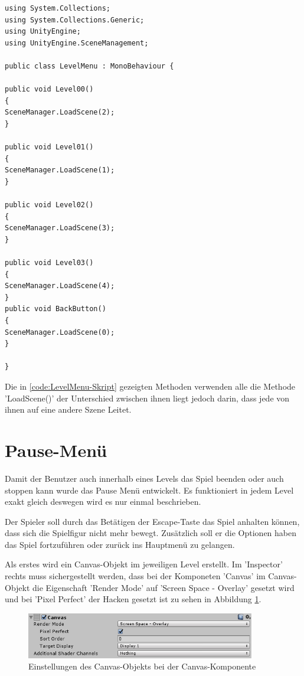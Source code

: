\begin{lstlisting}[language={[Sharp]C}, caption=LevelMenu-Script, label=code:LevelMenu-Skript]
using System.Collections;
using System.Collections.Generic;
using UnityEngine;
using UnityEngine.SceneManagement;

public class LevelMenu : MonoBehaviour {

public void Level00()
{
SceneManager.LoadScene(2);
}

public void Level01()
{
SceneManager.LoadScene(1);
}

public void Level02()
{
SceneManager.LoadScene(3);
}

public void Level03()
{
SceneManager.LoadScene(4);
}
public void BackButton()
{
SceneManager.LoadScene(0);
}

}
\end{lstlisting}

Die in \cref{code:LevelMenu-Skript} gezeigten Methoden verwenden alle die Methode 'LoadScene()' der Unterschied zwischen ihnen liegt jedoch darin, dass jede von ihnen auf eine andere Szene Leitet.
\section{Pause-Menü}
Damit der Benutzer auch innerhalb eines Levels das Spiel beenden oder auch stoppen kann wurde das Pause Menü entwickelt. Es funktioniert in jedem Level exakt gleich deswegen wird es nur einmal beschrieben. 

Der Spieler soll durch das Betätigen der Escape-Taste das Spiel anhalten können, dass sich die Spielfigur nicht mehr bewegt. Zusätzlich soll er die Optionen haben das Spiel fortzuführen oder zurück ins Hauptmenü zu gelangen. 

Als erstes wird ein Canvas-Objekt im jeweiligen Level erstellt. Im 'Inspector' rechts muss sichergestellt werden, dass bei der Komponeten 'Canvas' im Canvas-Objekt die Eigenschaft 'Render Mode' auf 'Screen Space - Overlay' gesetzt wird und bei 'Pixel Perfect' der Hacken gesetzt ist zu sehen in Abbildung \ref{CanvasPause}. 


\begin{figure}[H]
	\includegraphics[width=10cm]{images/CanvasPause.png}
	\caption{Einstellungen des Canvas-Objekts bei der Canvas-Komponente}
	\label{CanvasPause}
\end{figure}


